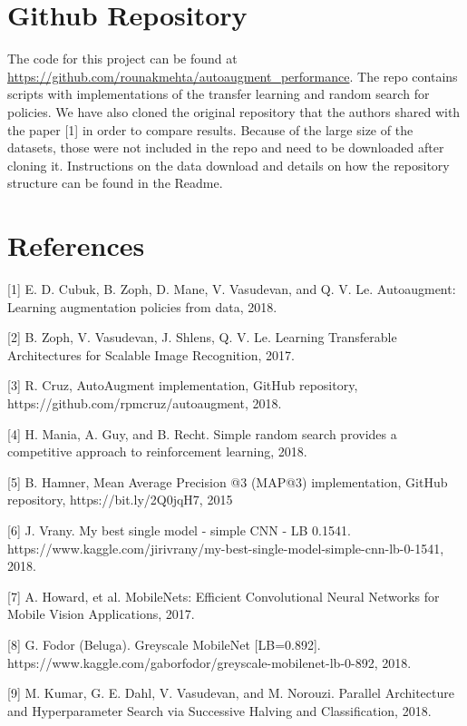 \documentclass[10pt,twocolumn,letterpaper]{article}
\begin{document}
\section{Github Repository}

The code for this project can be found at \url{https://github.com/rounakmehta/autoaugment_performance}. The repo contains scripts with implementations of the transfer learning and random search for policies. We have also cloned the original repository that the authors shared with the paper [1] in order to compare results. Because of the large size of the datasets, those were not included in the repo and need to be downloaded after cloning it. Instructions on the data download and details on how the repository structure can be found in the Readme.  

\section{References}

{\small



[1] E. D. Cubuk, B. Zoph, D. Mane, V. Vasudevan, and Q. V. Le. Autoaugment:   Learning  augmentation  policies  from  data, 2018. \newline

[2] B. Zoph, V. Vasudevan, J. Shlens, Q. V. Le. Learning Transferable Architectures for Scalable Image Recognition, 2017. \newline

[3] R. Cruz, AutoAugment implementation, GitHub repository, https://github.com/rpmcruz/autoaugment, 2018. \newline

[4] H. Mania, A. Guy, and B. Recht. Simple random search provides a competitive approach to reinforcement learning, 2018.\newline

[5] B. Hamner, Mean Average Precision @3 (MAP@3) implementation, GitHub repository, https://bit.ly/2Q0jqH7, 2015 \newline

[6] J. Vrany. My best single model - simple CNN - LB 0.1541. https://www.kaggle.com/jirivrany/my-best-single-model-simple-cnn-lb-0-1541, 2018.\newline

[7] A. Howard, et al. MobileNets: Efficient Convolutional Neural Networks for Mobile Vision
Applications, 2017. \newline

[8] G. Fodor (Beluga). Greyscale MobileNet [LB=0.892]. https://www.kaggle.com/gaborfodor/greyscale-mobilenet-lb-0-892, 2018.\newline

[9] M. Kumar, G. E. Dahl, V. Vasudevan, and M. Norouzi. Parallel Architecture and Hyperparameter Search
via Successive Halving and Classification, 2018.\newline

}
\end{document}
